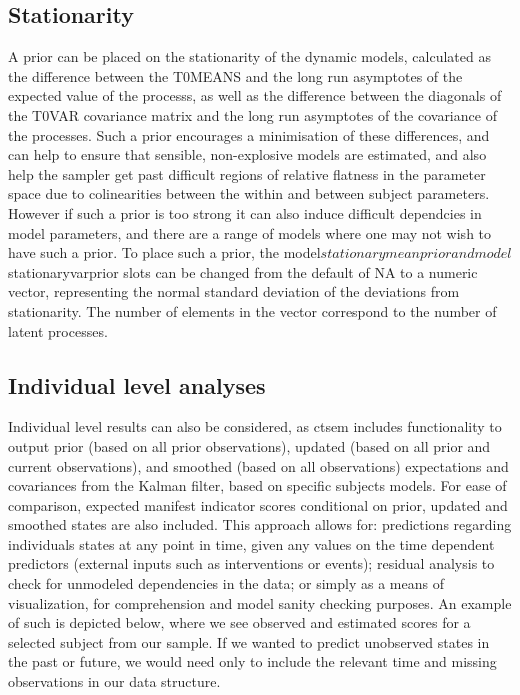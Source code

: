 \documentclass[nojss]{jss}\usepackage[]{graphicx}\usepackage[]{color}
\begin{document}
\subsection{Stationarity}
A prior can be placed on the stationarity of the dynamic models, calculated as the difference between the T0MEANS and the long run asymptotes of the expected value of the processs, as well as the difference between the diagonals of the T0VAR covariance matrix and the long run asymptotes of the covariance of the processes. Such a prior encourages a minimisation of these differences, and can help to ensure that sensible, non-explosive models are estimated, and also help the sampler get past difficult regions of relative flatness in the parameter space due to colinearities between the within and between subject parameters. However if such a prior is too strong it can also induce difficult dependcies in model parameters, and there are a range of models where one may not wish to have such a prior. To place such a prior, the model$stationarymeanprior and model$stationaryvarprior slots can be changed from the default of NA to a numeric vector, representing the normal standard deviation of the deviations from stationarity. The number of elements in the vector correspond to the number of latent processes.

\subsection{Individual level analyses}
Individual level results can also be considered, as ctsem includes functionality to output prior (based on all prior observations), updated (based on all prior and current observations), and smoothed (based on all observations) expectations and covariances from the Kalman filter, based on specific subjects models. For ease of comparison, expected manifest indicator scores conditional on prior, updated and smoothed states are also included. This approach allows for: predictions regarding individuals states at any point in time, given any values on the time dependent predictors (external inputs such as interventions or events); residual analysis to check for unmodeled dependencies in the data; or simply as a means of visualization, for comprehension and model sanity checking purposes. An example of such is depicted below, where we see observed and estimated scores for a selected subject from our sample. If we wanted to predict unobserved states in the past or future, we would need only to include the relevant time and missing observations in our data structure.
\end{document}
